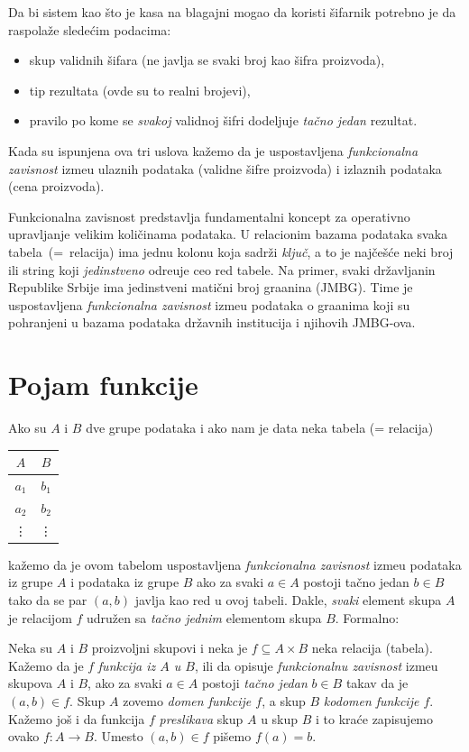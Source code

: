 Da bi sistem kao \v sto je kasa na blagajni mogao da koristi \v sifarnik potrebno je da raspola\v ze slede\'cim podacima:
\begin{itemize}
\item
  skup validnih \v sifara (ne javlja se svaki broj kao \v sifra proizvoda),
\item
  tip rezultata (ovde su to realni brojevi),
\item
  pravilo po kome se \emph{svakoj} validnoj \v sifri dodeljuje \emph{ta\v cno jedan} rezultat.
\end{itemize}
Kada su ispunjena ova tri uslova ka\v zemo da je uspostavljena \emph{funkcionalna zavisnost} izme\dj u
ulaznih podataka (validne \v sifre proizvoda) i izlaznih podataka (cena proizvoda).

Funkcionalna zavisnost predstavlja fundamentalni koncept za operativno uprav\-ljanje velikim koli\v cinama
podataka. U relacionim bazama podataka svaka tabela~(=~relacija) ima jednu kolonu koja
sadr\v zi \emph{klju\v c}, a to je naj\v ce\v s\'ce neki broj ili string
koji \emph{jedinstveno} odre\dj uje ceo red tabele.
Na primer, svaki dr\v zavljanin Republike Srbije ima jedinstveni mati\v cni broj gra\dj anina (JMBG).
Time je uspostavljena \emph{funkcionalna zavisnost} izme\dj u podataka o gra\dj anima koji su pohranjeni
u bazama podataka dr\v zavnih institucija i njihovih JMBG-ova.


\section{Pojam funkcije}

Ako su $A$ i $B$ dve grupe podataka i ako nam je data neka tabela (= relacija)
\begin{center}
  \begin{tabular}{cc}
    $A$ & $B$ \\
    \hline
    $a_1$ & $b_1$ \\
    $a_2$ & $b_2$ \\
    \vdots & \vdots
  \end{tabular}
\end{center}
ka\v zemo da je ovom tabelom uspostavljena \emph{funkcionalna zavisnost} izme\dj u podataka
iz grupe $A$ i podataka iz grupe $B$ ako za svaki $a \in A$ postoji ta\v cno jedan $b \in B$
tako da se par $(a, b)$ javlja kao red u ovoj tabeli. 
Dakle, \emph{svaki} element skupa $A$ je relacijom $f$ udru\v zen sa \emph{ta\v cno jednim} elementom skupa $B$.
Formalno:

\begin{DEF}
  Neka su $A$ i $B$ proizvoljni skupovi i neka je $f \subseteq A \times B$ neka relacija (tabela).
  Ka\v zemo da je $f$ \emph{funkcija iz $A$ u $B$}, ili da opisuje \emph{funkcionalnu zavisnost}
  izme\dj u skupova $A$ i $B$, ako za svaki $a \in A$ postoji \emph{ta\v cno jedan} $b \in B$
  takav da je $(a, b) \in f$.
  Skup $A$ zovemo \emph{domen funkcije $f$}, a skup $B$
  \emph{kodomen funkcije $f$}. Ka\v zemo jo\v s i da funkcija $f$ \emph{preslikava} skup $A$ u skup $B$
  i to kra\'ce zapisujemo ovako $f : A \to B$. Umesto $(a, b) \in f$ pi\v semo $f(a) = b$.
\end{DEF}


